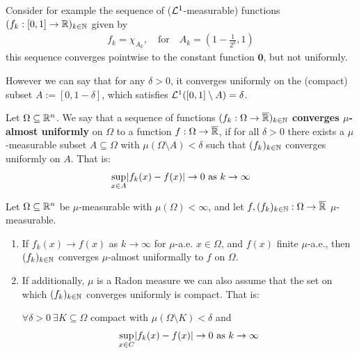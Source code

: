 Consider for example the sequence of ($\mathcal{L}^{1}$-measurable) functions $(f_k: [0,1] \to \mathbb{R})_{k \in \mathbb{N}}$ given by
\begin{align*}
  f_k = \chi_{A_k}, \quad \text{for} \quad A_{k} = \left(1 - \frac{1}{2^{k}},1\right)
\end{align*}
this sequence converges pointwise to the constant function $\bm{0}$, but not uniformly.

However we can say that for any $\delta > 0$, it converges uniformly on the (compact) subset $A := [0,1 - \delta]$, which satisfies $\mathcal{L}^{1}([0,1] \setminus A) = \delta$.


\begin{dfn}[]
  Let $\Omega \subseteq \mathbb{R}^{n}$.
  We say that a sequence of functions $(f_k: \Omega \to \overline{\mathbb{R}})_{k \in \mathbb{N}}$ \textbf{converges $\mu$-almost uniformly} on $\Omega$ to a function $f: \Omega \to \overline{\mathbb{R}}$,
if for all $\delta > 0$ there exists a $\mu$-measurable subset $A \subseteq \Omega$ with $\mu(\Omega \setminus A) < \delta$ such that $(f_k)_{k \in \mathbb{N}}$ converges uniformly on $A$.
That is:
\begin{align*}
  \sup_{x \in A} \abs{f_k(x) - f(x)} \to  0 \text{ as } k \to  \infty
\end{align*}
\end{dfn}


\begin{thm}[Egoroff]
  Let $\Omega \subseteq \mathbb{R}^{n}$ be $\mu$-measurable with $\mu(\Omega) < \infty$,
  and let
  $f,(f_k)_{k \in \mathbb{N}}: \Omega \to \overline{\mathbb{R}}$ $\mu$-measurable.
  \begin{enumerate}
    \item 
      If $f_k(x) \to  f(x)$ as $k \to  \infty$ for $\mu$-a.e. $x \in \Omega$, and $f(x)$ finite $\mu$-a.e., 
      then $(f_k)_{k \in \mathbb{N}}$ converges $\mu$-almost uniformally to $f$ on $\Omega$.
    \item 
      If additionally, $\mu$ is a Radon measure we can also assume that the set on which $(f_k)_{k \in \mathbb{N}}$ converges uniformly is compact.
      That is:

      $\forall \delta > 0\ \exists K \subseteq \Omega$ compact with $\mu(\Omega \setminus K) < \delta$ and
      \begin{align*}
        \sup_{x \in C} \abs{f_k(x) - f(x)} \to 0 \text{ as } k \to  \infty
      \end{align*}
  \end{enumerate}
\end{thm}

